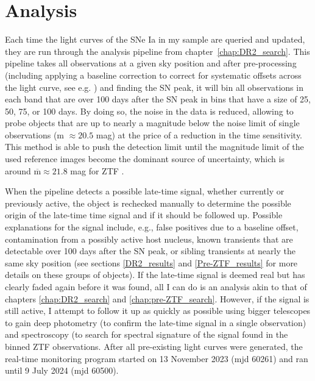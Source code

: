 \documentclass[a4paper,oneside,12pt, class=Latex/Classes/PhDthesisPSnPDF, crop=false]{standalone}
\begin{document}
\section{Analysis}
\label{analysis}
Each time the light curves of the SNe Ia in my sample are queried and updated, they are run through the analysis pipeline from chapter~\ref{chap:DR2_search}. This pipeline takes all observations at a given sky position and after pre-processing (including applying a baseline correction to correct for systematic offsets across the light curve, see e.g. \citealt{Yao_baseline_corr, Miller_baseline_corr}) and finding the SN peak, it will bin all observations in each band that are over 100 days after the SN peak in bins that have a size of 25, 50, 75, or 100 days. By doing so, the noise in the data is reduced, allowing to probe objects that are up to nearly a magnitude below the noise limit of single observations (m $\approx20.5$ mag) at the price of a reduction in the time sensitivity. This method is able to push the detection limit until the magnitude limit of the used reference images become the dominant source of uncertainty, which is around $\overline{\text{m}} \approx21.8$ mag for ZTF \citep{ref_uncert}.

When the pipeline detects a possible late-time signal, whether currently or previously active, the object is rechecked manually to determine the possible origin of the late-time time signal and if it should be followed up. Possible explanations for the signal include, e.g., false positives due to a baseline offset, contamination from a possibly active host nucleus, known transients that are detectable over 100 days after the SN peak, or sibling transients at nearly the same sky position (see sections \ref{DR2_results} and \ref{Pre-ZTF_results} for more details on these groups of objects). If the late-time signal is deemed real but has clearly faded again before it was found, all I can do is an analysis akin to that of chapters \ref{chap:DR2_search} and \ref{chap:pre-ZTF_search}. However, if the signal is still active, I attempt to follow it up as quickly as possible using bigger telescopes to gain deep photometry (to confirm the late-time signal in a single observation) and spectroscopy (to search for spectral signature of the signal found in the binned ZTF observations. After all pre-existing light curves were generated, the real-time monitoring program started on 13 November 2023 (mjd 60261) and ran until 9 July 2024 (mjd 60500).
\end{document}
